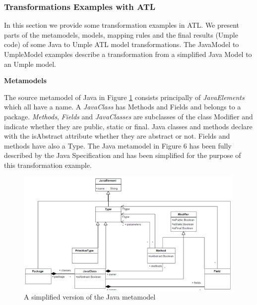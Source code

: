 \subsubsection{Transformations Examples with ATL}
\label{subsubsec:exampleATL}

In this section we provide some transformation examples in ATL. We present parts of the metamodels, models, mapping rules and the final results (Umple code) of some Java to Umple ATL model transformations.
The JavaModel to UmpleModel examples describe a transformation from a simplified Java Model to an Umple model. 

\textbf{Metamodels} 

The source metamodel of Java in Figure \ref{fig:javamodelatl} consists principally of \textit{JavaElements} which all have a name. A \textit{JavaClass} has Methods and Fields and belongs to a package. \textit{Methods}, \textit{Fields} and \textit{JavaClasses} are subclasses of the class Modifier and indicate whether they are public, static or final. Java classes and methods declare with the isAbstract attribute whether they are abstract or not. Fields and methods have also a Type. The Java metamodel in Figure 6 has been fully described by the Java Specification \cite{javaSpec} and has been simplified for the purpose of this transformation example.

\begin{figure}[h!]
\centering
\includegraphics[width=0.99\textwidth]{Figures/javametamodel.png} 
\caption{A simplified version of the Java metamodel}
\label{fig:javamodelatl}
\end{figure}

